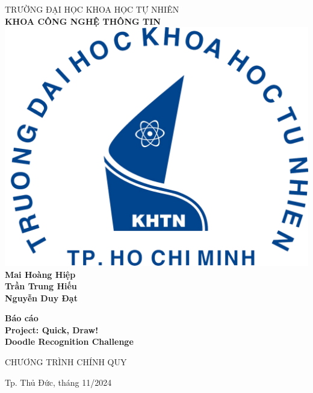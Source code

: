 \begin{titlepage}

\begin{center}
TRƯỜNG ĐẠI HỌC KHOA HỌC TỰ NHIÊN\\
\textbf{KHOA CÔNG NGHỆ THÔNG TIN}\\[2cm]

\includegraphics[width=0.3\linewidth]{images/logo-khtn.png}
\\[2cm]
{ \Large \bfseries Mai Hoàng Hiệp \\Trần Trung Hiếu \\Nguyễn Duy Đạt \\[2cm] } 


{ \Large \bfseries Báo cáo \\Project: Quick, Draw! \\Doodle Recognition Challenge\\[3cm] } 


\large CHƯƠNG TRÌNH CHÍNH QUY\\



\vfill
Tp. Thủ Đức, tháng 11/2024

\end{center}


\end{titlepage}
